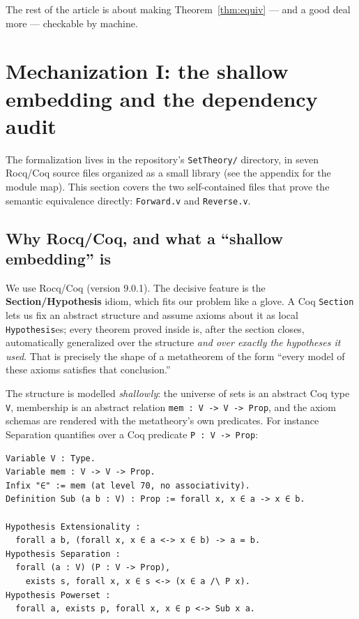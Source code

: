 \documentclass[11pt]{article}
\theoremstyle{plain}
\theoremstyle{definition}
\newcommand{\cq}[1]{\lstinline[basicstyle=\ttfamily]|#1|}
\begin{document}
The rest of the article is about making Theorem~\ref{thm:equiv} --- and a good deal
more --- checkable by machine.

\section{Mechanization I: the shallow embedding and the dependency audit}\label{sec:mech-shallow}

The formalization lives in the repository's \texttt{SetTheory/} directory, in
seven Rocq/Coq source files organized as a small library (see the
appendix for the module map). This section covers the two self-contained files
that prove the semantic equivalence directly: \texttt{Forward.v} and
\texttt{Reverse.v}.

\subsection{Why Rocq/Coq, and what a ``shallow embedding'' is}

We use Rocq/Coq (version 9.0.1). The decisive feature is the
\textbf{Section/Hypothesis} idiom, which fits our problem like a glove. A Coq
\cq{Section} lets us fix an abstract structure and assume axioms about it as local
\cq{Hypothesis}es; every theorem proved inside is, after the section closes,
automatically generalized over the structure \emph{and over exactly the hypotheses
it used}. That is precisely the shape of a metatheorem of the form ``every model of
these axioms satisfies that conclusion.''

The structure is modelled \emph{shallowly}: the universe of sets is an abstract Coq
type \cq{V}, membership is an abstract relation \cq{mem : V -> V -> Prop}, and the
axiom schemas are rendered with the metatheory's own predicates. For instance
Separation quantifies over a Coq predicate \cq{P : V -> Prop}:

\begin{lstlisting}
Variable V : Type.
Variable mem : V -> V -> Prop.
Infix "∈" := mem (at level 70, no associativity).
Definition Sub (a b : V) : Prop := forall x, x ∈ a -> x ∈ b.

Hypothesis Extensionality :
  forall a b, (forall x, x ∈ a <-> x ∈ b) -> a = b.
Hypothesis Separation :
  forall (a : V) (P : V -> Prop),
    exists s, forall x, x ∈ s <-> (x ∈ a /\ P x).
Hypothesis Powerset :
  forall a, exists p, forall x, x ∈ p <-> Sub x a.
\end{lstlisting}
\end{document}
